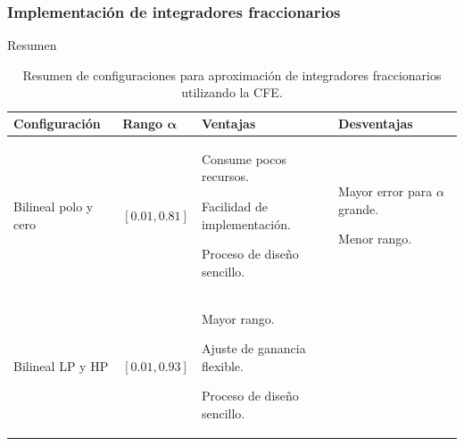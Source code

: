 \documentclass[10pt]{beamer}
\begin{document}
	\begin{frame}
		\frametitle{Implementación de integradores fraccionarios}
		\begin{block}{Resumen}
		\begin{scriptsize}
			\begin{table}[!ht]
	  \centering
	  \caption{Resumen de configuraciones para aproximación de integradores fraccionarios utilizando la CFE.}
	  \label{tab:resumen_config}
	  \begin{tabular}{>{\centering\arraybackslash}m{2cm} >{\centering\arraybackslash}m{1cm} >{\centering\arraybackslash}m{3cm} >{\centering\arraybackslash}m{3cm}}
	    \hline
	    \textbf{Configuración} & \textbf{Rango} $\bm{\alpha}$ & \textbf{Ventajas}  & \textbf{Desventajas}\\ 
	    \hline
	      Bilineal polo y cero
	    &
	     $[0.01, 0.81]$
	    & 
	      \begin{itemize}[leftmargin=0cm,noitemsep]
	      \begin{scriptsize}
			\item[] Consume pocos recursos.
			\item[] Facilidad de implementación.
			\item[] Proceso de diseño sencillo.
	      \end{scriptsize}
	      \end{itemize}
	     & 
	      \begin{itemize}[leftmargin=0cm,noitemsep]
	      \begin{scriptsize}
			\item[] Mayor error para $\alpha$ grande.
			\item[] Menor rango.
	      \end{scriptsize}
	      \end{itemize}
	    \\ %
	      Bilineal LP y HP
	    &
	      $[0.01, 0.93]$
	    & 
	      \begin{itemize}[leftmargin=0cm,noitemsep]
	      \begin{scriptsize}
			\item[] Mayor rango.
			\item[] Ajuste de ganancia flexible.
			\item[] Proceso de diseño sencillo.
	      \end{scriptsize}
	      \end{itemize}
	     & 
	      \begin{itemize}[leftmargin=0cm,noitemsep]

\end{itemize}
\end{tabular}
\end{table}
\end{scriptsize}
\end{block}
\end{frame}
\end{document}
